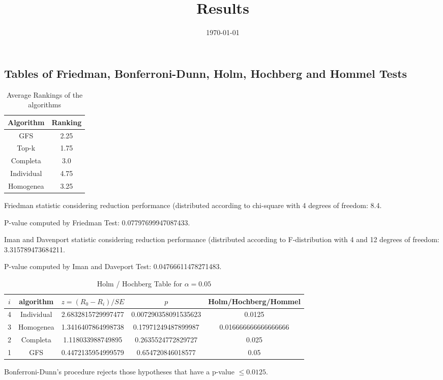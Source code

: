 \documentclass[a4paper,10pt]{article}
\title{Results}
\author{}
\date{\today}
\begin{document}
\begin{landscape}
\oddsidemargin 0in \topmargin 0in\maketitle
\section{Tables of Friedman, Bonferroni-Dunn, Holm, Hochberg and Hommel Tests}
\begin{table}[!htp]
\centering
\caption{Average Rankings of the algorithms
}\begin{tabular}{c|c}
Algorithm&Ranking\\
\hline
GFS&2.25\\
Top-k&1.75\\
Completa&3.0\\
Individual&4.75\\
Homogenea&3.25\\
\end{tabular}
\end{table}


Friedman statistic considering reduction performance (distributed according to chi-square with 4 degrees of freedom: 8.4.


P-value computed by Friedman Test: 0.07797699947087433.\newline

Iman and Davenport statistic considering reduction performance (distributed according to F-distribution with 4 and 12 degrees of freedom: 3.315789473684211.


P-value computed by Iman and Daveport Test: 0.04766611478271483.\newline

\begin{table}[!htp]
\centering\tiny
\caption{Holm / Hochberg Table for $\alpha=0.05$}
\begin{tabular}{ccccc}
$i$&algorithm&$z=(R_0 - R_i)/SE$&$p$&Holm/Hochberg/Hommel\\
\hline
4&Individual&2.6832815729997477&0.007290358091535623&0.0125\\
3&Homogenea&1.3416407864998738&0.17971249487899987&0.016666666666666666\\
2&Completa&1.118033988749895&0.2635524772829727&0.025\\
1&GFS&0.4472135954999579&0.654720846018577&0.05\\
\hline
\end{tabular}
\end{table}
Bonferroni-Dunn's procedure rejects those hypotheses that have a p-value $\le0.0125$.



\end{landscape}
\end{document}
